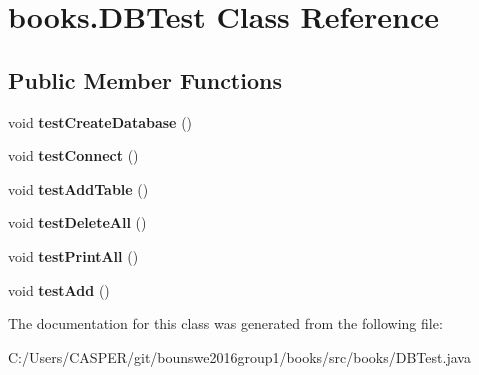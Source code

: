 \hypertarget{classbooks_1_1_d_b_test}{}\section{books.\+D\+B\+Test Class Reference}
\label{classbooks_1_1_d_b_test}
\subsection*{Public Member Functions}
\begin{DoxyCompactItemize}
\item 
void {\bfseries test\+Create\+Database} ()\hypertarget{classbooks_1_1_d_b_test_a65247d71a78792196af8523224b11465}{}\label{classbooks_1_1_d_b_test_a65247d71a78792196af8523224b11465}

\item 
void {\bfseries test\+Connect} ()\hypertarget{classbooks_1_1_d_b_test_aaf94330c7eb37d590d465175b8ab0d52}{}\label{classbooks_1_1_d_b_test_aaf94330c7eb37d590d465175b8ab0d52}

\item 
void {\bfseries test\+Add\+Table} ()\hypertarget{classbooks_1_1_d_b_test_a60b3a36d1910953e191bd7c82d70b748}{}\label{classbooks_1_1_d_b_test_a60b3a36d1910953e191bd7c82d70b748}

\item 
void {\bfseries test\+Delete\+All} ()\hypertarget{classbooks_1_1_d_b_test_adad838ddd43d9eec5d73466df977bde1}{}\label{classbooks_1_1_d_b_test_adad838ddd43d9eec5d73466df977bde1}

\item 
void {\bfseries test\+Print\+All} ()\hypertarget{classbooks_1_1_d_b_test_a4972f03d141975851af84e9468b4fdb3}{}\label{classbooks_1_1_d_b_test_a4972f03d141975851af84e9468b4fdb3}

\item 
void {\bfseries test\+Add} ()\hypertarget{classbooks_1_1_d_b_test_aac2293539e1604732ad7142e38d1771f}{}\label{classbooks_1_1_d_b_test_aac2293539e1604732ad7142e38d1771f}

\end{DoxyCompactItemize}


The documentation for this class was generated from the following file\+:\begin{DoxyCompactItemize}
\item 
C\+:/\+Users/\+C\+A\+S\+P\+E\+R/git/bounswe2016group1/books/src/books/D\+B\+Test.\+java\end{DoxyCompactItemize}
